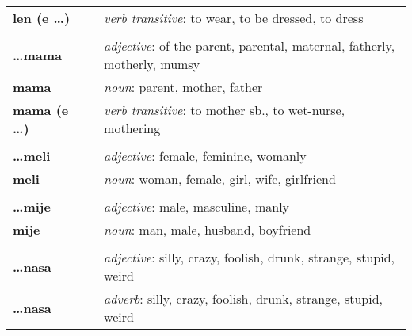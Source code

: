 \begin{supertabular}{p{2,5cm}|ll}
    \textbf{len (e \dots)}     &  & \textit{verb transitive}: to wear, to be dressed, to dress                              \\ %
                               &  &                                                                                         \\ %
    \textbf{\dots mama}        &  & \textit{adjective}: of the parent, parental, maternal, fatherly, motherly, mumsy        \\ %
    \textbf{mama}              &  & \textit{noun}: parent, mother, father                                                   \\ %
    \textbf{mama (e \dots)}    &  & \textit{verb transitive}: to mother sb., to wet-nurse, mothering                        \\ %
                               &  &                                                                                         \\ %
    \textbf{\dots meli}        &  & \textit{adjective}: female, feminine, womanly                                           \\ %
    \textbf{meli}              &  & \textit{noun}: woman, female, girl, wife, girlfriend                                    \\ %
                               &  &                                                                                         \\ %
    \textbf{\dots mije}        &  & \textit{adjective}: male, masculine, manly                                              \\ %
    \textbf{mije}              &  & \textit{noun}: man, male, husband, boyfriend                                            \\ %
                               &  &                                                                                         \\ %
    \textbf{\dots nasa}        &  & \textit{adjective}: silly, crazy, foolish, drunk, strange, stupid, weird                \\ %
    \textbf{\dots nasa}        &  & \textit{adverb}: silly, crazy, foolish, drunk, strange, stupid, weird                   \\ %

\end{supertabular}
